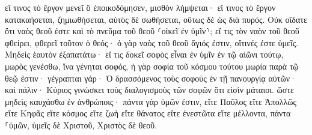 \documentclass{openreader}
\begin{document}
εἴ τινος τὸ ἔργον μενεῖ ὃ ἐποικοδόμησεν, μισθὸν λήμψεται· 
εἴ τινος τὸ ἔργον κατακαήσεται, ζημιωθήσεται, αὐτὸς δὲ σωθήσεται, οὕτως δὲ ὡς διὰ πυρός. 
Οὐκ οἴδατε ὅτι ναὸς θεοῦ ἐστε καὶ τὸ πνεῦμα τοῦ θεοῦ ⸂οἰκεῖ ἐν ὑμῖν⸃; 
εἴ τις τὸν ναὸν τοῦ θεοῦ φθείρει, φθερεῖ τοῦτον ὁ θεός· ὁ γὰρ ναὸς τοῦ θεοῦ ἅγιός ἐστιν, οἵτινές ἐστε ὑμεῖς. 
Μηδεὶς ἑαυτὸν ἐξαπατάτω· εἴ τις δοκεῖ σοφὸς εἶναι ἐν ὑμῖν ἐν τῷ αἰῶνι τούτῳ, μωρὸς γενέσθω, ἵνα γένηται σοφός, 
ἡ γὰρ σοφία τοῦ κόσμου τούτου μωρία παρὰ τῷ θεῷ ἐστιν· γέγραπται γάρ· Ὁ δρασσόμενος τοὺς σοφοὺς ἐν τῇ πανουργίᾳ αὐτῶν· 
καὶ πάλιν· Κύριος γινώσκει τοὺς διαλογισμοὺς τῶν σοφῶν ὅτι εἰσὶν μάταιοι. 
ὥστε μηδεὶς καυχάσθω ἐν ἀνθρώποις· πάντα γὰρ ὑμῶν ἐστιν, 
εἴτε Παῦλος εἴτε Ἀπολλῶς εἴτε Κηφᾶς εἴτε κόσμος εἴτε ζωὴ εἴτε θάνατος εἴτε ἐνεστῶτα εἴτε μέλλοντα, πάντα ⸀ὑμῶν, 
ὑμεῖς δὲ Χριστοῦ, Χριστὸς δὲ θεοῦ. 
\end{document}
